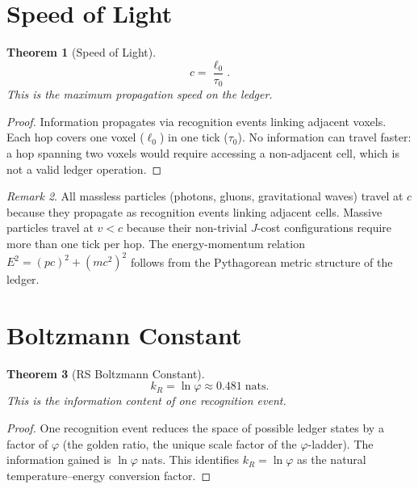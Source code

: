 \documentclass[12pt,a4paper]{article}
\newtheorem{theorem}{Theorem}[section]
\theoremstyle{definition}
\theoremstyle{remark}
\newtheorem{remark}[theorem]{Remark}
\begin{document}
\section{Speed of Light}
\label{sec:c}

\begin{theorem}[Speed of Light]
\label{thm:c}
\begin{equation}
  \boxed{c = \frac{\ell_0}{\tau_0}.}
\end{equation}
This is the maximum propagation speed on the ledger.
\end{theorem}

\begin{proof}
Information propagates via recognition events linking adjacent
voxels.  Each hop covers one voxel ($\ell_0$) in one tick
($\tau_0$).  No information can travel faster: a hop spanning two
voxels would require accessing a non-adjacent cell, which is not
a valid ledger operation.
\end{proof}

\begin{remark}
All massless particles (photons, gluons, gravitational waves)
travel at $c$ because they propagate as recognition events linking
adjacent cells.  Massive particles travel at $v < c$ because their
non-trivial $J$-cost configurations require more than one tick per
hop.  The energy-momentum relation $E^2 = (pc)^2 + (mc^2)^2$
follows from the Pythagorean metric structure of the ledger.
\end{remark}

\section{Boltzmann Constant}
\label{sec:kB}

\begin{theorem}[RS Boltzmann Constant]
\label{thm:kB}
\begin{equation}
  \boxed{k_R = \ln\varphi \approx 0.481\;\mathrm{nats}.}
\end{equation}
This is the information content of one recognition event.
\end{theorem}

\begin{proof}
One recognition event reduces the space of possible ledger states
by a factor of $\varphi$ (the golden ratio, the unique scale
factor of the $\varphi$-ladder).  The information gained is
$\ln\varphi$ nats.  This identifies $k_R = \ln\varphi$ as the
natural temperature--energy conversion factor.
\end{proof}
\end{document}
